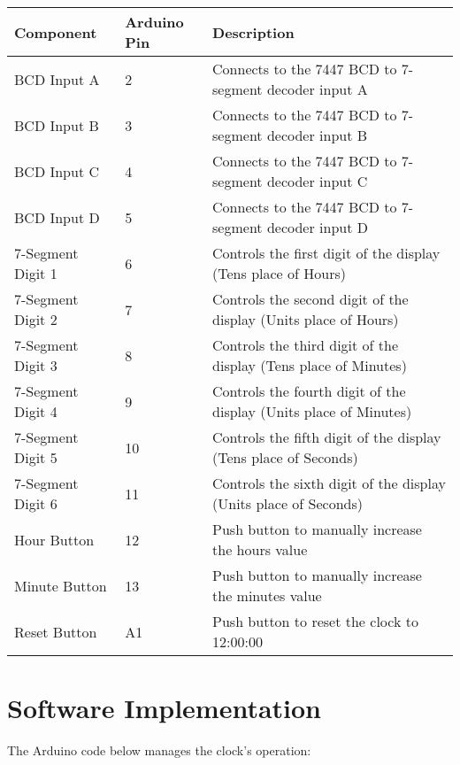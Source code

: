 \documentclass[a4paper,12pt]{article}
\theoremstyle{remark}
\begin{document}
\begin{table}[H]
    \centering
    \begin{tabular}{|l|l|p{8cm}|}
        \hline
        \textbf{Component} & \textbf{Arduino Pin} & \textbf{Description} \\
        \hline
        BCD Input A        & 2                   & Connects to the 7447 BCD to 7-segment decoder input A \\
        BCD Input B        & 3                   & Connects to the 7447 BCD to 7-segment decoder input B \\
        BCD Input C        & 4                   & Connects to the 7447 BCD to 7-segment decoder input C \\
        BCD Input D        & 5                   & Connects to the 7447 BCD to 7-segment decoder input D \\
        7-Segment Digit 1  & 6                   & Controls the first digit of the display (Tens place of Hours) \\
        7-Segment Digit 2  & 7                   & Controls the second digit of the display (Units place of Hours) \\
        7-Segment Digit 3  & 8                   & Controls the third digit of the display (Tens place of Minutes) \\
        7-Segment Digit 4  & 9                   & Controls the fourth digit of the display (Units place of Minutes) \\
        7-Segment Digit 5  & 10                  & Controls the fifth digit of the display (Tens place of Seconds) \\
        7-Segment Digit 6  & 11                  & Controls the sixth digit of the display (Units place of Seconds) \\
        Hour Button        & 12                  & Push button to manually increase the hours value \\
        Minute Button      & 13                  & Push button to manually increase the minutes value \\
        Reset Button       & A1                  & Push button to reset the clock to 12:00:00 \\
        \hline
    \end{tabular}
\end{table}
\section{Software Implementation}
The Arduino code below manages the clock's operation:
\end{document}
